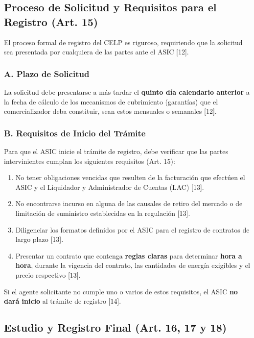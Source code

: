 \documentclass[a5paper]{book}%
\begin{document}
  \subsection{Proceso de Solicitud y Requisitos para el Registro (Art. 15)}
  
  El proceso formal de registro del CELP es riguroso, requiriendo que la solicitud sea presentada por cualquiera de las partes ante el ASIC [12].
  
  \subsubsection*{A. Plazo de Solicitud}
  La solicitud debe presentarse a más tardar el \textbf{quinto día calendario anterior} a la fecha de cálculo de los mecanismos de cubrimiento (garantías) que el comercializador deba constituir, sean estos mensuales o semanales [12].
  
  \subsubsection*{B. Requisitos de Inicio del Trámite}
  Para que el ASIC inicie el trámite de registro, debe verificar que las partes intervinientes cumplan los siguientes requisitos (Art. 15):
  \begin{enumerate}
  	\item No tener obligaciones vencidas que resulten de la facturación que efectúen el ASIC y el Liquidador y Administrador de Cuentas (LAC) [13].
  	\item No encontrarse incurso en alguna de las causales de retiro del mercado o de limitación de suministro establecidas en la regulación [13].
  	\item Diligenciar los formatos definidos por el ASIC para el registro de contratos de largo plazo [13].
  	\item Presentar un contrato que contenga \textbf{reglas claras} para determinar \textbf{hora a hora}, durante la vigencia del contrato, las cantidades de energía exigibles y el precio respectivo [13].
  \end{enumerate}
  Si el agente solicitante no cumple uno o varios de estos requisitos, el ASIC \textbf{no dará inicio} al trámite de registro [14].
  
  \subsection{Estudio y Registro Final (Art. 16, 17 y 18)}
  
\end{document}
